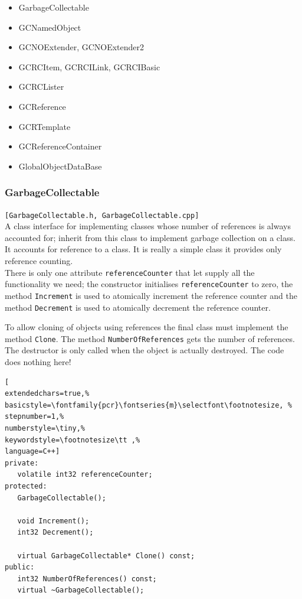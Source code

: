 \begin{itemize}
 \item GarbageCollectable
 \item GCNamedObject
 \item GCNOExtender, GCNOExtender2

 \item GCRCItem, GCRCILink, GCRCIBasic
 \item GCRCLister
 \item GCReference

 \item GCRTemplate
 \item GCReferenceContainer
 \item GlobalObjectDataBase
\end{itemize}



\subsubsection{GarbageCollectable}
\texttt{[GarbageCollectable.h, GarbageCollectable.cpp]}\\
A class interface for implementing classes whose number of references is always accounted for; inherit from this class to implement garbage collection on a class. It accounts for reference to a class. It is really a simple class it provides only reference counting. \\


There is only one attribute \texttt{referenceCounter} that let supply all the functionality we need; the constructor initialises \texttt{referenceCounter} to zero, the method \texttt{Increment} is used to atomically increment the reference counter and the method \texttt{Decrement} is used to atomically decrement the reference counter.

To allow cloning of objects using references the final class must implement the method \texttt{Clone}. The method \texttt{NumberOfReferences} gets the number of references. The destructor is only called when the object is actually destroyed. The code does nothing here!

\begin{lstlisting}[
extendedchars=true,%
basicstyle=\fontfamily{pcr}\fontseries{m}\selectfont\footnotesize, %
stepnumber=1,%
numberstyle=\tiny,%
keywordstyle=\footnotesize\tt ,%
language=C++]
private:
   volatile int32 referenceCounter;
protected:
   GarbageCollectable();

   void Increment();
   int32 Decrement();

   virtual GarbageCollectable* Clone() const;
public:
   int32 NumberOfReferences() const;
   virtual ~GarbageCollectable();
\end{lstlisting}



